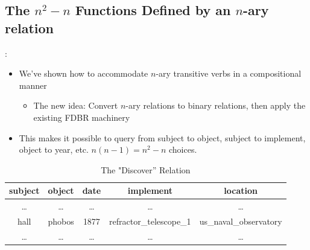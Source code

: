 \documentclass[logoontitle,tabu,supertabular,aspectratio=43]{preney-uwindsor-beamer}
\begin{document}
    \subsection{The $n^2 - n$ Functions Defined by an $n$-ary relation}
    \begin{frame}{\insertsection: \insertsubsection}
    \begin{itemize}
        \item We've shown how to accommodate $n$-ary transitive verbs in a compositional manner
        \begin{itemize}
            \item The new idea: Convert $n$-ary relations to binary relations, then apply the existing FDBR machinery
        \end{itemize}
        \item This makes it possible to query from subject to object, subject to implement, object to year, etc. $n(n - 1) = n^2 - n$ choices.
    \end{itemize}
    \setlength{\tabcolsep}{0.4em} %
    \renewcommand{\arraystretch}{1}%
    \vspace{-1.5em}
    \begin{table}
        \caption{The "Discover'' Relation}
        \centering
        \begin{tabular}{  c c c c c  }
            \hline \hline
            subject & object & date & implement & location \\
            \hline
            \dots & \dots & \dots & \dots & \dots \\
            hall & phobos & 1877 & refractor\_telescope\_1 & us\_naval\_observatory \\
            \dots & \dots & \dots & \dots & \dots \\
            \hline \hline
        \end{tabular}
        \vspace{-1em}
        \label{tab:discover}
    \end{table}
\end{frame}
\end{document}
